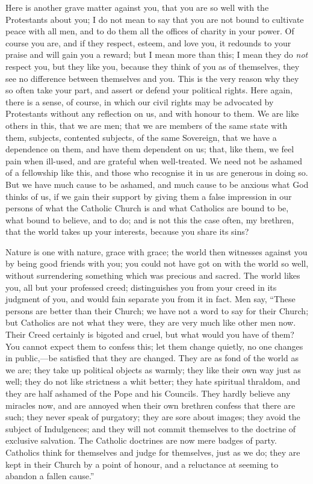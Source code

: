 Here is another grave matter against you, that you are so well with
the Protestants about you; I do not mean to say that you are not bound
to cultivate peace with all men, and to do them all the offices of
charity in your power. Of course you are, and if they respect, esteem,
and love you, it redounds to your praise and will gain you a reward;
but I mean more than this; I mean they do \emph{not} respect you, but
they like you, because they think of you as of themselves, they see no
difference between themselves and you. This is the very reason why
they so often take your part, and assert or defend your political
rights. Here again, there is a sense, of course, in which our civil
rights may be advocated by Protestants without any reflection on us,
and with honour to them. We are like others in this, that we are men;
that we are members of the same state with them, subjects, contented
subjects, of the same Sovereign, that we have a dependence on them,
and have them dependent on us; that, like them, we feel pain when
ill-used, and are grateful when well-treated. We need not be ashamed
of a fellowship like this, and those who recognise it in us are
generous in doing so. But we have much cause to be ashamed, and much
cause to be anxious what God thinks of us, if we gain their support by
giving them a false impression in our persons of what the Catholic
Church is and what Catholics are bound to be, what bound to believe,
and to do; and is not this the case often, my brethren, that the world
takes up your interests, because you share its sins?

Nature is one with nature, grace with grace; the world then
witnesses against you by being good friends with you; you could not
have got on with the world so well, without surrendering something
which was precious and sacred. The world likes you, all but your
professed creed; distinguishes you from your creed in its judgment of
you, and would fain separate you from it in fact. Men say, ``These
persons are better than their Church; we have not a word to say for
their Church; but Catholics are not what they were, they are very much
like other men now. Their Creed certainly is bigoted and cruel, but
what would you have of them? You cannot expect them to confess this;
let them change quietly, no one changes in public,—be satisfied that
they are changed. They are as fond of the world as we are; they take
up political objects as warmly; they like their own way just as well;
they do not like strictness a whit better; they hate spiritual
thraldom, and they are half ashamed of the Pope and his Councils. They
hardly believe any miracles now, and are annoyed when their own
brethren confess that there are such; they never speak of purgatory;
they are sore about images; they avoid the subject of Indulgences; and
they will not commit themselves to the doctrine of exclusive
salvation. The Catholic doctrines are now mere badges of party.
Catholics think for themselves and judge for themselves, just as we
do; they are kept in their Church by a point of honour, and a
reluctance at seeming to abandon a fallen cause.''

